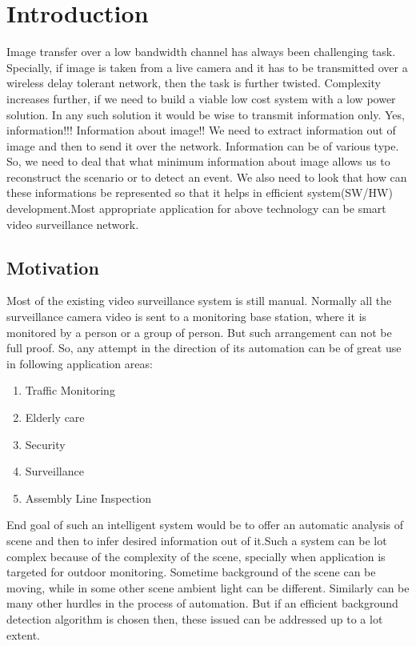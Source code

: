 
\chapter{Introduction} %
\label{Chapter1}
Image transfer over a low bandwidth channel has always been challenging
task. Specially, if image is taken from a live camera and it has to be
transmitted over a wireless delay tolerant network, then the task is further
twisted. Complexity increases further, if we need to build a viable low
cost system with a low power solution. In any such solution it would be
wise to transmit information only. Yes, information!!!  Information
about image!! We need to extract information out of image and then to
send it over the network.  Information can be of various type. So, we
need to deal that what minimum information about image allows us to
reconstruct the scenario or to detect an event. We also need to look
that how can these informations be represented so that it helps in
efficient system(SW/HW) development.Most appropriate application for
above technology can be smart video surveillance network.

\section{Motivation}

Most of the existing video surveillance system is still manual. Normally
all the surveillance camera video is sent to a monitoring base station,
where it is monitored by a person or a group of person. But such
arrangement can not be full proof. So, any attempt in the direction of
its automation can be of great use in following application areas:
\begin{enumerate}
 \item  Traffic Monitoring
  \item Elderly care
  \item Security
  \item Surveillance
  \item Assembly Line Inspection
\end{enumerate}

End goal of such an intelligent system would be to offer an
automatic analysis of scene and then to infer desired information out of
it.Such a system can be lot complex because of the complexity of the
scene, specially when application is targeted for outdoor monitoring.
Sometime background of the scene can be moving, while in some
other scene ambient light can be different. Similarly can be many other
hurdles in the process of automation. But if an efficient
background detection algorithm is chosen then, these issued can be
addressed up to a lot extent.



